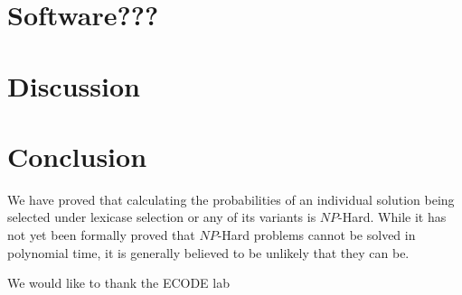 \documentclass[sigconf]{acmart}
\begin{document}
\section{Software???}



\section{Discussion}



\section{Conclusion}

We have proved that calculating the probabilities of an individual solution being selected under lexicase selection or any of its variants is $NP$-Hard. While it has not yet been formally proved that $NP$-Hard problems cannot be solved in polynomial time, it is generally believed to be unlikely that they can be.  

\begin{acks}
We would like to thank the ECODE lab
\end{acks}







\end{document}
